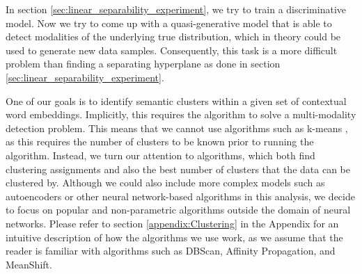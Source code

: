 \documentclass[a4paper,12pt,oneside,openright]{report}
\begin{document}
In section \ref{sec:linear_separability_experiment}, we try to train a discriminative model.
Now we try to come up with a quasi-generative model that is able to detect modalities of the underlying true distribution, which in theory could be used to generate new data samples.
Consequently, this task is a more difficult problem than finding a separating hyperplane as done in section \ref{sec:linear_separability_experiment}. 

One of our goals is to identify semantic clusters within a given set of contextual word embeddings.
Implicitly, this requires the algorithm to solve a multi-modality detection problem.
This means that we cannot use algorithms such as k-means \cite{lloyd57, macqueen67}, as this requires the number of clusters to be known prior to running the algorithm.
Instead, we turn our attention to algorithms, which both find clustering assignments and also the best number of clusters that the data can be clustered by.
Although we could also include more complex models such as autoencoders or other neural network-based algorithms in this analysis, we decide to focus on popular and non-parametric algorithms outside the domain of neural networks.
Please refer to section \ref{appendix:Clustering} in the Appendix for an intuitive description of how the algorithms we use work, as we assume that the reader is familiar with algorithms such as DBScan, Affinity Propagation, and MeanShift. \\
\end{document}
